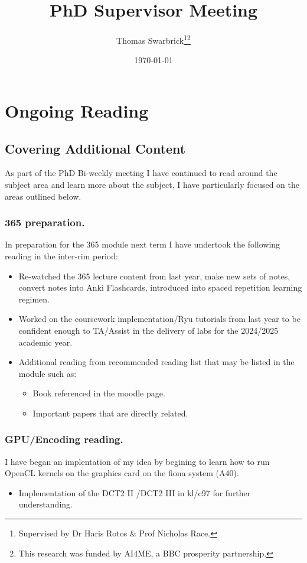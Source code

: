 \documentclass[]{scrreprt}
\title{PhD Supervisor Meeting}
\author{Thomas Swarbrick\footnote{Supervised by Dr Haris Rotos \& Prof Nicholas Race.}\footnote{This research was funded by AI4ME, a BBC prosperity partnership.}}
\date{\today}
\begin{document}
\maketitle

\chapter{Ongoing  Reading}
\section{Covering Additional Content}
As part of the PhD Bi-weekly meeting I have continued to read around the subject area and learn more about the subject, I have particularly focused on the areas outlined below.
\subsection{365 preparation.}

In preparation for the 365 module next term I have undertook the following reading in the inter-rim period:
\begin{itemize}
  \item Re-watched the 365 lecture content from last year, make new sets of notes, convert notes into Anki Flashcards, introduced into spaced repetition learning regimen.
  \item Worked on the coursework implementation/Ryu tutorials from last year to be confident enough to TA/Assist in the delivery of labs for the 2024/2025 academic year.
  \item Additional reading from recommended reading list that may be listed in the module such as:
        \begin{itemize}
          \item Book referenced in the moodle page.
          \item Important papers that are directly related.
        \end{itemize}
\end{itemize}
\subsection{GPU/Encoding reading.}

I have began an implentation of my idea by begining to learn how to run OpenCL kernels on the graphics card on the fiona system (A40).
\begin{itemize}
  \item Implementation of the DCT2 II /DCT2 III in kl/c97 for further understanding.
\end{itemize}
\end{document}
